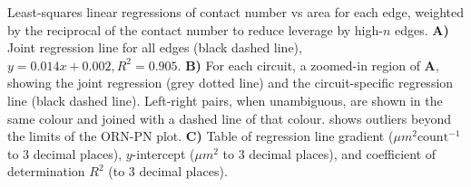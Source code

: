 Least-squares linear regressions of contact number vs area for each edge, weighted by the reciprocal of the contact number to reduce leverage by high-$n$ edges.
\textbf{A)} Joint regression line for all edges (black dashed line), $y = 0.014x + 0.002, R^2 = 0.905$.
\textbf{B)} For each circuit, a zoomed-in region of \textbf{A}, showing the joint regression (grey dotted line) and the circuit-specific regression line (black dashed line).
Left-right pairs, when unambiguous, are shown in the same colour and joined with a dashed line of that colour.
\textdagger shows outliers beyond the limits of the ORN-PN plot.
\textbf{C)} Table of regression line gradient ($\mu m^2 \textrm{count}^{-1}$ to 3 decimal places), $y$-intercept ($\mu m^2$ to 3 decimal places), and coefficient of determination $R^2$ (to 3 decimal places).